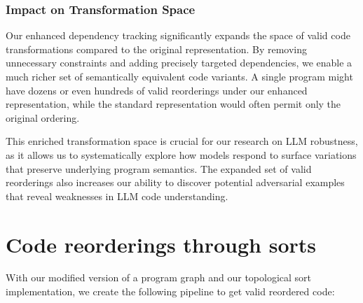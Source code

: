 \documentclass[%
thesis=student,%
coverpage=false,%
titlepage=false,%
headmarks=true, %
english,%
font=libertine, %
math=newpxtx, %
BCOR=5mm,%
coverBCOR=11mm%
]{tum-templates/book/tumbook}
\begin{document}
\subsubsection{Impact on Transformation Space}

Our enhanced dependency tracking significantly expands the space of valid code transformations compared to the original representation. By removing unnecessary constraints and adding precisely targeted dependencies, we enable a much richer set of semantically equivalent code variants. A single program might have dozens or even hundreds of valid reorderings under our enhanced representation, while the standard representation would often permit only the original ordering.

This enriched transformation space is crucial for our research on LLM robustness, as it allows us to systematically explore how models respond to surface variations that preserve underlying program semantics. The expanded set of valid reorderings also increases our ability to discover potential adversarial examples that reveal weaknesses in LLM code understanding.

\section{Code reorderings through sorts}
\label{sec:Code_reorderings_through_sorts}

With our modified version of a program graph and our topological sort implementation, we create the following pipeline to get valid reordered code:
\end{document}
